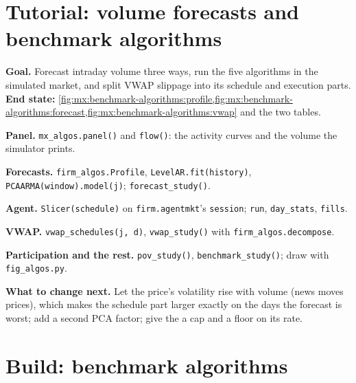 \section{Tutorial: volume forecasts and benchmark algorithms}\label{tut:mx:benchmark-algorithms:tut}

\begin{tutorial}
\textbf{Goal.} Forecast intraday volume three ways, run the five algorithms in the simulated market, and split VWAP slippage into its schedule and
execution parts.
\textbf{End state:} \cref{fig:mx:benchmark-algorithms:profile,fig:mx:benchmark-algorithms:forecast,fig:mx:benchmark-algorithms:vwap} and the two tables.
\begin{tutsteps}
\item \textbf{Panel.} \texttt{mx\_algos.panel()} and \texttt{flow()}: the activity curves and the volume the simulator prints.
\item \textbf{Forecasts.} \texttt{firm\_algos.Profile}, \texttt{LevelAR.fit(history)}, \texttt{PCAARMA(window).model(j)}; \texttt{forecast\_study()}.
\item \textbf{Agent.} \texttt{Slicer(schedule)} on \texttt{firm.agentmkt}'s \texttt{session}; \texttt{run}, \texttt{day\_stats}, \texttt{fills}.
\item \textbf{VWAP.} \texttt{vwap\_schedules(j, d)}, \texttt{vwap\_study()} with \texttt{firm\_algos.decompose}.
\item \textbf{Participation and the rest.} \texttt{pov\_study()}, \texttt{benchmark\_study()}; draw with \texttt{fig\_algos.py}.
\end{tutsteps}
\textbf{What to change next.} Let the price's volatility rise with volume (news moves prices), which makes the schedule part larger exactly on the
days the forecast is worst; add a second PCA factor; give the  a cap and a floor on its rate.
\end{tutorial}

\section{Build: benchmark algorithms}\label{bld:mx:benchmark-algorithms:algos}


